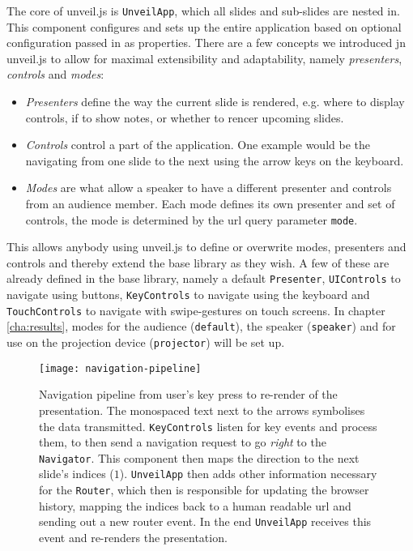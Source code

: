 The core of unveil.js is \texttt{UnveilApp}, which all slides and sub-slides are nested in. This component configures and sets up the entire application based on optional configuration passed in as properties. There are a few concepts we introduced jn unveil.js to allow for maximal extensibility and adaptability, namely \emph{presenters}, \emph{controls} and \emph{modes}:
%
\begin{itemize}
\item \textit{Presenters} define the way the current slide is rendered, e.g. where to display controls, if to show notes, or whether to rencer upcoming slides.
\item \textit{Controls} control a part of the application. One example would be the navigating from one slide to the next using the arrow keys on the keyboard.
\item \textit{Modes} are what allow a speaker to have a different presenter and controls from an audience member. Each mode defines its own presenter and set of controls, the mode is determined by the url query parameter \texttt{mode}.
\end{itemize}
This allows anybody using unveil.js to define or overwrite modes, presenters and controls and thereby extend the base library as they wish. A few of these are already defined in the base library, namely a default \texttt{Presenter}, \texttt{UIControls} to navigate using buttons, \texttt{KeyControls} to navigate using the keyboard and \texttt{TouchControls} to navigate with swipe-gestures on touch screens. In chapter \ref{cha:results}, modes for the audience (\texttt{de\-fault}), the speak\-er (\texttt{speak\-er}) and for use on the projection device (\texttt{projector}) will be set up.

\begin{figure}
\centering
\texttt{[image: navigation-pipeline]}
\caption{Navigation pipeline from user's key press to re-render of the presentation. The monospaced text next to the arrows symbolises the data transmitted. \texttt{KeyControls} listen for key events and process them, to then send a navigation request to go \emph{right} to the \texttt{Navigator}. This component then maps the direction to the next slide's indices ($1$). \texttt{UnveilApp} then adds other information necessary for the \texttt{Router}, which then is responsible for updating the browser history, mapping the indices back to a human readable url and sending out a new router event. In the end \texttt{UnveilApp} receives this event and re-renders the presentation.}
\label{fig:implementation-technologies-unveil-navigation}
\end{figure}

